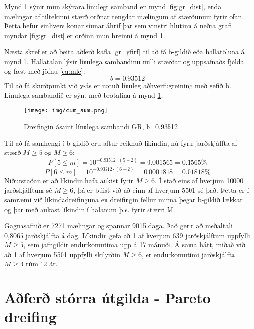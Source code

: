 \documentclass[10pt,a4paper,titlepage,twoside]{article}
\begin{document}
Mynd \ref{fig:cum_sum} sýnir mun skýrara línulegt samband en mynd \ref{fig:gr_dist}, enda mælingar af tiltekinni stærð orðnar tengdar mælingum af stærðunum fyrir ofan. Þetta hefur einhvers konar síunar áhrif þar sem vinstri hlutinn á neðra grafi myndar \ref{fig:gr_dist} er orðinn mun hreinni á mynd \ref{fig:cum_sum}.

Næsta skref er að beita aðferð kafla \ref{gr_yfirf} til að fá b-gildið eða hallatöluna á mynd \ref{fig:cum_sum}. Hallatalan lýsir línulega sambandinu milli stærðar og uppsafnaðs fjölda og fæst með jöfnu \ref{eq:mle}: $$b=0.93512$$ Til að fá skurðpunkt við y-ás er notuð línuleg aðhverfugreining með gefið b. Línulega sambandið er sýnt með brotalínu á mynd \ref{fig:cum_sum}.

\begin{figure}[H]
  \centering
  \texttt{[image: img/cum\_sum.png]}
  \vspace{-4mm}
  \caption{Dreifingin ásamt línulega sambandi GR, b=0.93512}
  \label{fig:cum_sum}
\end{figure}

Til að fá samhengi í b-gildið eru aftur reiknuð líkindin, nú fyrir jarðskjálfta af stærð $M\geq5$ og $M\geq6$: $$P[5\leq m]=10^{-0.93512\cdot(5-2)}=0.001565=0.1565\%$$ $$P[6\leq m]=10^{-0.93512\cdot(6-2)}=0.0001818=0.01818\%$$ Niðurstaðan er að líkindin hafa aukist fyrir $M\geq6$. Í stað eins af hverjum 10000 jarðskjálftum sé $M\geq6$, þá er búist við að einn af hverjum 5501 sé það. Þetta er í samræmi við líkindadreifinguna en dreifingin fellur minna þegar b-gildið lækkar og þar með aukast líkindin í halanum þ.e. fyrir stærri M.

Gagnasafnið er 7271 mælingar og spannar 9015 daga. Það gerir að meðaltali 0,8065 jarðskjálfta á dag. Líkindin gefa að 1 af hverjum 639 jarðskjálftum uppfylli $M\geq5$, sem jafngildir endurkomutíma upp á 17 mánuði. Á sama hátt, miðað við að 1 af hverjum 5501 uppfylli skilyrðin $M\geq6$, er endurkomutími jarðskjálfta $M\geq6$ rúm 12 ár.


\clearpage
\section{Aðferð stórra útgilda - Pareto dreifing}
\end{document}
